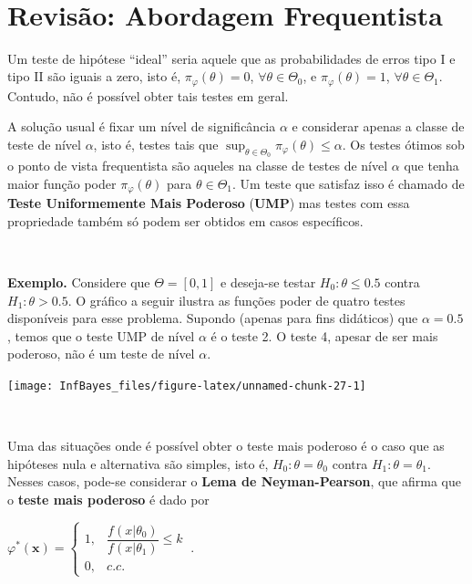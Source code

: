 \documentclass[
]{book}
\begin{document}
\(~\)

\hypertarget{revisuxe3o-abordagem-frequentista}{%
\section{Revisão: Abordagem Frequentista}\label{revisuxe3o-abordagem-frequentista}}

Um teste de hipótese ``ideal'' seria aquele que as probabilidades de erros tipo I e tipo II são iguais a zero, isto é, \(\pi_\varphi(\theta)=0\), \(\forall \theta \in \Theta_0\), e \(\pi_\varphi(\theta)=1\), \(\forall \theta \in \Theta_1\). Contudo, não é possível obter tais testes em geral.

A solução usual é fixar um nível de significância \(\alpha\) e considerar apenas a classe de teste de nível \(\alpha\), isto é, testes tais que \(\displaystyle\sup_{\theta\in\Theta_0}\pi_\varphi(\theta) \leq \alpha\). Os testes ótimos sob o ponto de vista frequentista são aqueles na classe de testes de nível \(\alpha\) que tenha maior função poder \({\pi}_\varphi(\theta)\) para \(\theta \in \Theta_1\). Um teste que satisfaz isso é chamado de \textbf{Teste Uniformemente Mais Poderoso} (\textbf{UMP}) mas testes com essa propriedade também só podem ser obtidos em casos específicos.

\(~\)

\textbf{Exemplo.} Considere que \(\Theta=[0,1]\) e deseja-se testar \(H_0: \theta \leq 0.5\) contra \(H_1: \theta > 0.5\). O gráfico a seguir ilustra as funções poder de quatro testes disponíveis para esse problema. Supondo (apenas para fins didáticos) que \(\alpha=0.5\), temos que o teste UMP de nível \(\alpha\) é o teste 2. O teste 4, apesar de ser mais poderoso, não é um teste de nível \(\alpha\).

\begin{center}\texttt{[image: InfBayes\_files/figure-latex/unnamed-chunk-27-1]} \end{center}

\(~\)

Uma das situações onde é possível obter o teste mais poderoso é o caso que as hipóteses nula e alternativa são simples, isto é, \(H_0:\theta=\theta_0\) contra \(H_1:\theta=\theta_1\). Nesses casos, pode-se considerar o \textbf{Lema de Neyman-Pearson}, que afirma que o \textbf{teste mais poderoso} é dado por

\({\varphi}^*(\boldsymbol x)=\left\{\begin{array}{rl} 1,& \dfrac{f(x|\theta_0)}{f(x|\theta_1)}\leq k\\ 0,& c.c.\end{array}\right.~.\)
\end{document}
